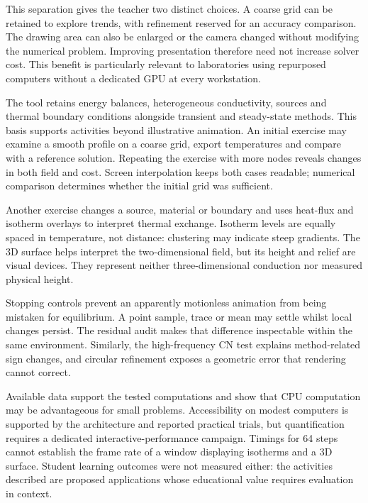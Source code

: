 \documentclass[11pt,a4paper]{article}
\begin{document}
This separation gives the teacher two distinct choices. A coarse grid can be retained to explore trends, with refinement reserved for an accuracy comparison. The drawing area can also be enlarged or the camera changed without modifying the numerical problem. Improving presentation therefore need not increase solver cost. This benefit is particularly relevant to laboratories using repurposed computers without a dedicated GPU at every workstation.

The tool retains energy balances, heterogeneous conductivity, sources and thermal boundary conditions alongside transient and steady-state methods. This basis supports activities beyond illustrative animation. An initial exercise may examine a smooth profile on a coarse grid, export temperatures and compare with a reference solution. Repeating the exercise with more nodes reveals changes in both field and cost. Screen interpolation keeps both cases readable; numerical comparison determines whether the initial grid was sufficient.

Another exercise changes a source, material or boundary and uses heat-flux and isotherm overlays to interpret thermal exchange. Isotherm levels are equally spaced in temperature, not distance: clustering may indicate steep gradients. The 3D surface helps interpret the two-dimensional field, but its height and relief are visual devices. They represent neither three-dimensional conduction nor measured physical height.

Stopping controls prevent an apparently motionless animation from being mistaken for equilibrium. A point sample, trace or mean may settle whilst local changes persist. The residual audit makes that difference inspectable within the same environment. Similarly, the high-frequency CN test explains method-related sign changes, and circular refinement exposes a geometric error that rendering cannot correct.

Available data support the tested computations and show that CPU computation may be advantageous for small problems. Accessibility on modest computers is supported by the architecture and reported practical trials, but quantification requires a dedicated interactive-performance campaign. Timings for 64 steps cannot establish the frame rate of a window displaying isotherms and a 3D surface. Student learning outcomes were not measured either: the activities described are proposed applications whose educational value requires evaluation in context.
\end{document}
